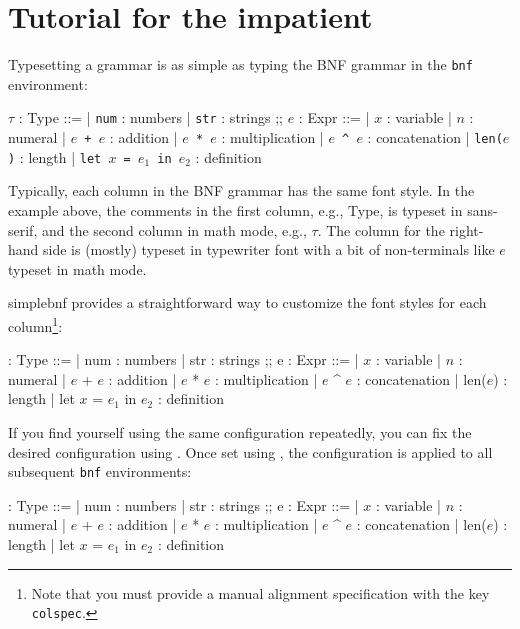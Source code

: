 \documentclass[11pt]{article}
\begin{document}
\section{Tutorial for the impatient}\label{sec:tutorial}
Typesetting a grammar is as simple as typing the BNF grammar in the \verb/bnf/ environment:
\begin{example}[righthand width=.52\linewidth]
\begin{center}
\begin{bnf}
  $\tau$ : \textsf{Type} ::=
  | \texttt{num} : numbers
  | \texttt{str} : strings
  ;;
  $e$ : \textsf{Expr} ::=
  | $x$ : variable
  | $n$ : numeral
  | \texttt{$e$ + $e$} : addition
  | \texttt{$e$ * $e$} : multiplication
  | \texttt{$e$ \textasciicircum{} $e$} : concatenation
  | \texttt{len($e$)} : length
  | \texttt{let $x$ = $e_1$ in $e_2$} : definition
\end{bnf}
\end{center}
\end{example}

Typically, each column in the BNF grammar has the same font style.
In the example above, the comments in the first column, e.g., \textsf{Type}, is typeset in sans-serif, and the second column in math mode, e.g., $\tau$.
The column for the right-hand side is (mostly) typeset in typewriter font with a bit of non-terminals like $e$ typeset in math mode.

\textsf{simplebnf} provides a straightforward way to customize the font styles for each column\footnote{Note that you must provide a manual alignment specification with the key \texttt{colspec}.}:
\begin{listing}
\begin{bnf}[
  colspec = {llcll},
  column{1} = {font = \sffamily},
  column{2} = {mode = dmath},
  column{4} = {font = \ttfamily},
]
  \tau : Type ::=
  | num : numbers
  | str : strings
  ;;
  e : Expr ::=
  | $x$ : variable
  | $n$ : numeral
  | $e$ + $e$ : addition
  | $e$ * $e$ : multiplication
  | $e$ \textasciicircum{} $e$ : concatenation
  | len($e$) : length
  | let $x$ = $e_1$ in $e_2$ : definition
\end{bnf}
\end{listing}
If you find yourself using the same configuration repeatedly, you can fix the desired configuration using .
Once set using , the configuration is applied to all subsequent \verb/bnf/ environments:
\begin{listing}
\begin{bnf}
  \tau : Type ::=
  | num : numbers
  | str : strings
  ;;
  e : Expr ::=
  | $x$ : variable
  | $n$ : numeral
  | $e$ + $e$ : addition
  | $e$ * $e$ : multiplication
  | $e$ \textasciicircum{} $e$ : concatenation
  | len($e$) : length
  | let $x$ = $e_1$ in $e_2$ : definition
\end{bnf}
\end{listing}
\end{document}
